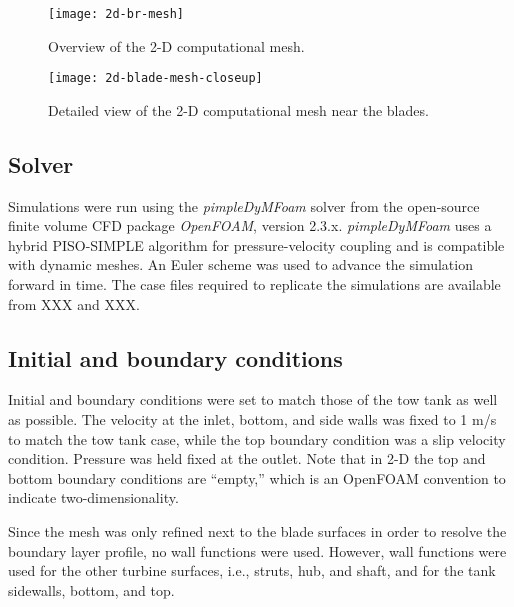 \begin{figure}
    \centering
    
    \texttt{[image: 2d-br-mesh]}

    \caption{Overview of the 2-D computational mesh.}

    \label{fig:2d-br-mesh}
\end{figure}


\begin{figure}
    \centering
    
    \texttt{[image: 2d-blade-mesh-closeup]}

    \caption{Detailed view of the 2-D computational mesh near the blades.}

    \label{fig:blade-mesh}
\end{figure}


\subsection{Solver}

Simulations were run using the \textit{pimpleDyMFoam} solver from the
open-source finite volume CFD package \textit{OpenFOAM}, version 2.3.x.
\textit{pimpleDyMFoam} uses a hybrid PISO-SIMPLE algorithm for pressure-velocity
coupling and is compatible with dynamic meshes. An Euler scheme was used to
advance the simulation forward in time. The case files required to replicate the
simulations are available from XXX and XXX. 


\subsection{Initial and boundary conditions}

Initial and boundary conditions were set to match those of the tow tank as well
as possible. The velocity at the inlet, bottom, and side walls was fixed to 1
m/s to match the tow tank case, while the top boundary condition was a slip
velocity condition. Pressure was held fixed at the outlet. Note that in 2-D the
top and bottom boundary conditions are ``empty,'' which is an OpenFOAM
convention to indicate two-dimensionality.

Since the mesh was only refined next to the blade surfaces in order to resolve
the boundary layer profile, no wall functions were used. However, wall functions
were used for the other turbine surfaces, i.e., struts, hub, and shaft, and for
the tank sidewalls, bottom, and top.


